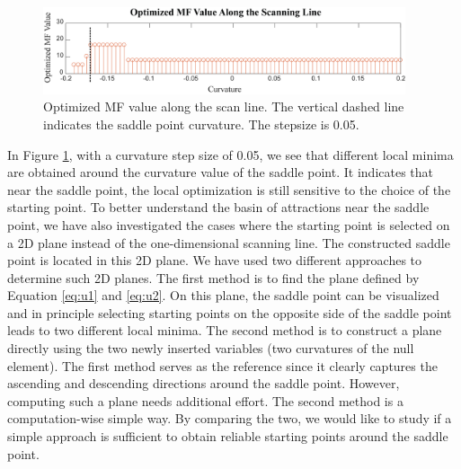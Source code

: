 \begin{figure}[h!]
    \centering
    \includegraphics[width=0.95\textwidth]{chapter-4/figures/Scanning_Line_plot.png}
    \caption{Optimized MF value along the scan line. The vertical dashed line indicates the saddle point curvature. The stepsize is 0.05.}
    \label{fig: scanning_line}
\end{figure}

In Figure \ref{fig: scanning_line}, with a curvature step size of 0.05, we see that different local minima are obtained around the curvature value of the saddle point. It indicates that near the saddle point, the local optimization is still sensitive to the choice of the starting point. To better understand the basin of attractions near the saddle point, we have also investigated the cases where the starting point is selected on a 2D plane instead of the one-dimensional scanning line. The constructed saddle point is located in this 2D plane. We have used two different approaches to determine such 2D planes. The first method is to find the plane defined by Equation \ref{eq:u1} and \ref{eq:u2}. On this plane, the saddle point can be visualized and in principle selecting starting points on the opposite side of the saddle point leads to two different local minima. The second method is to construct a plane directly using the two newly inserted variables (two curvatures of the null element). The first method serves as the reference since it clearly captures the ascending and descending directions around the saddle point. However, computing such a plane needs additional effort. The second method is a computation-wise simple way. By comparing the two, we would like to study if a simple approach is sufficient to obtain reliable starting points around the saddle point. 

